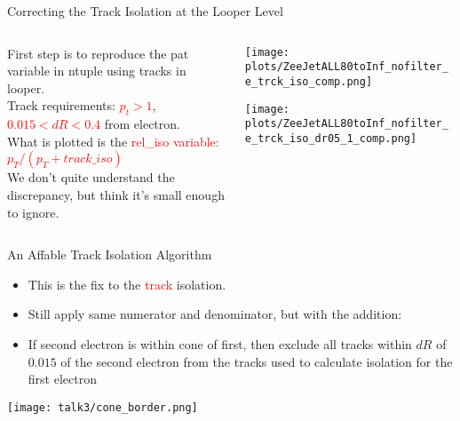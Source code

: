 \documentclass{beamer}
\begin{document}
\begin{frame}{Correcting the Track Isolation at the Looper Level}
  \begin{columns}

    \begin{column}{0.4\textwidth}
      First step is to reproduce the pat variable in ntuple using tracks in looper. \\ \bigskip
      Track requirements: \textcolor{red}{$p_t > 1$}, \textcolor{red}{$0.015 < dR < 0.4$} from electron. \\ \bigskip
      What is plotted is the \textcolor{red}{rel\_iso variable: $p_T/(p_T + track\_iso)$} \\ \bigskip
      We don't quite understand the discrepancy, but think it's small enough to ignore. \\ \bigskip
    \end{column}

    \begin{column}{0.58\textwidth}
      \texttt{[image: plots/ZeeJetALL80toInf\_nofilter\_e\_trck\_iso\_comp.png]}

      \texttt{[image: plots/ZeeJetALL80toInf\_nofilter\_e\_trck\_iso\_dr05\_1\_comp.png]}
    \end{column}

  \end{columns}
\end{frame}


\begin{frame}{An Affable Track Isolation Algorithm}
  \begin{itemize}
    \item This is the fix to the \textcolor{red}{track} isolation.
    \item Still apply same numerator and denominator, but with the addition:
    \item If second electron is within cone of first, then exclude all tracks within $dR$ of $0.015$ of the second electron from the tracks used to calculate isolation for the first electron
  \end{itemize}

  \begin{center}
    \texttt{[image: talk3/cone\_border.png]}
  \end{center}

\end{frame}
\end{document}
